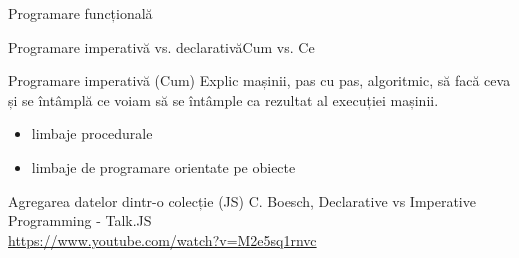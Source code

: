\documentclass[xcolor=pdftex,romanian,colorlinks]{beamer}
\begin{document}
\begin{section}{Programare funcțională}


\begin{frame}{Programare imperativă vs. declarativă}{Cum vs. Ce}
\begin{block}{Programare imperativă (Cum)}
Explic mașinii, pas cu pas, algoritmic,  să facă ceva\\
și se întâmplă \alert{ce} voiam să se întâmple ca rezultat al execuției mașinii.
{\begin{itemize}
\item limbaje procedurale
\item limbaje de programare orientate pe obiecte
\end{itemize}}
\end{block}

\end{frame}




\begin{frame}[fragile]{Agregarea datelor dintr-o colecție (JS)}{
C. Boesch, Declarative vs Imperative Programming - Talk.JS\\
\url{https://www.youtube.com/watch?v=M2e5sq1rnvc}}


\end{frame}
\end{section}
\end{document}
